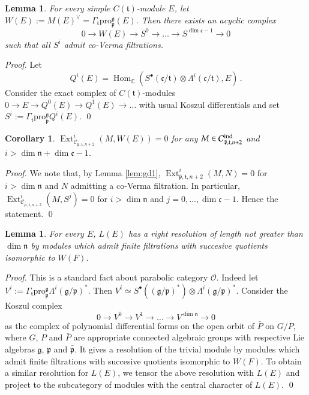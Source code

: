 \documentclass{tglat2e}
\newtheorem{lemma}[theorem]{Lemma}
\newtheorem{corollary}[theorem]{Corollary}
\theoremstyle{definition}
\theoremstyle{remark}
\newcommand{\cc}{\mathfrak{c}}
\renewcommand{\tt}{\mathfrak{t}}
\newcommand{\nn}{\mathfrak{n}}
\newcommand{\pp}{\mathfrak{p}}
\renewcommand{\gg}{\mathfrak{g}}
\newcommand{\pro}{\mathrm{pro}}
\DeclareMathOperator{\Hom}{Hom}
\DeclareMathOperator{\Ext}{Ext}
\begin{document}
\begin{lemma}\label{lem:gd2} For every simple $C(\tt)$-module $E$, let $W(E):=M(E)^\vee=\Gamma_\tt\pro^\gg_\pp(E)$. Then there exists an acyclic complex
$$0\to W(E)\to S^0\to\dots\to S^{\dim \cc-1}\to 0$$
such that all $S^i$ admit co-Verma filtrations.
\end{lemma}
\begin{proof} Let
$$Q^i(E)=\Hom_{\mathbb C}\left(S^\bullet(\cc/\tt)\otimes\Lambda^i(\cc/\tt),E\right)\,.$$
Consider the exact complex of $C(\tt)$-modules
$0\to E\to Q^0(E)\to Q^1(E)\to\dots $
with usual Koszul differentials and set
$S^i:=\Gamma_\tt\pro^\gg_\pp  Q^i(E)$.
\qed\end{proof}

\begin{corollary} \label{cor:gd1}  $\Ext_{\mathcal{C}_{\bar{\pp},\tt,n+2}}^i(M,W(E))=0$ for any $M\in \mathcal C^{\text{\rm ind}}_{\bar{\pp},\tt,n+2}$ and $i>\dim\nn+\dim\cc -1$. 
\end{corollary}
\begin{proof} We note that, by Lemma \ref{lem:gd1},
  $\Ext_{\bar{\pp},\tt,n+2}^i(M,N)=0$ for $i>\dim \nn$ and $N$
  admitting a co-Verma filtration. In particular,
$\Ext_{\mathcal{C}_{\bar{\pp},\tt,n+2}}^i(M,S^j)=0$ for $i>\dim \nn$ and $j=0,\dots,\dim\cc-1$. Hence the statement. 
\qed\end{proof}

\begin{lemma}\label{lem:gd3}  For every $E$, $L(E)$ has a right resolution of length not greater than $\dim \nn$ by modules which admit finite
filtrations with succesive quotients isomorphic to $W(F)$.
\end{lemma}
\begin{proof} This is a standard fact about parabolic category $\mathcal O$. Indeed let $V^i:=\Gamma_\tt\pro^\gg_\pp \Lambda^i(\gg/\pp)^*$.
Then $V^i\simeq S^\bullet((\gg/\pp)^*)\otimes\Lambda^i(\gg/\pp)^*$. Consider the Koszul complex
$$0\to V^0\to V^1\to\dots\to V^{\dim \nn}\to 0$$
as the complex of polynomial differential forms on the open orbit of
$\bar P$ on $G/P$, where $G$, $P$ and $\bar P$ are appropriate
connected algebraic groups with respective Lie algebras $\gg$, $\pp$
and $\bar{\pp}$.  It gives a resolution of the trivial module by modules which admit
finite filtrations with succesive quotients isomorphic to $W(F)$. To obtain a similar resolution for $L(E)$, we tensor the above resolution with $L(E)$
and project to the subcategory of modules with the central character of $L(E)$.
\qed\end{proof}
\end{document}
